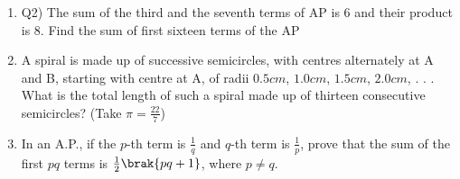 \begin{enumerate}[label=\thechapter.\arabic*,ref=\thechapter.\theenumi]
\item Q2) The sum of the third and the seventh terms of AP is 6 and their product is 8. Find the sum of first sixteen terms of the AP \\
\solution
\pagebreak
\item A spiral is made up of successive semicircles, with centres alternately at A and B, starting with centre at A, of radii $0.5 cm$, $1.0 cm$, $1.5 cm$, $2.0 cm$, . . . What is the total length of such a spiral made up of thirteen consecutive semicircles? (Take $\pi = \frac{22}{7}$)\\
\solution
\newpage
\item In an A.P., if the $p$-th term is $\frac{1}{q}$ and $q$-th term is $\frac{1}{p}$, prove that the sum of the first $pq$ terms is $\frac{1}{2}\brak{pq + 1}$, where $p \neq q$.
\solution
\pagebreak
\end{enumerate}
